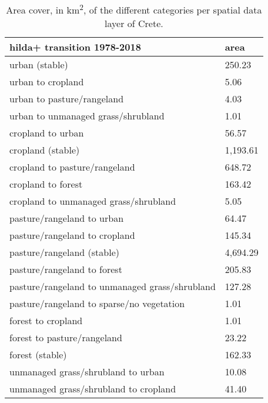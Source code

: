 \begin{longtable}{ll}
    \caption{Area cover, in km\textsuperscript{2}, of the different categories per spatial data layer of Crete. \label{table:crete_data_cube_area}} \\
\textbf{hilda+ transition 1978-2018}               & \textbf{area}    \\
\endfirsthead
%
\endhead
%
urban (stable)                                     & 250.23           \\
urban to cropland                                  & 5.06             \\
urban to pasture/rangeland                         & 4.03             \\
urban to unmanaged grass/shrubland                 & 1.01             \\
cropland to urban                                  & 56.57            \\
cropland (stable)                                  & 1,193.61         \\
cropland to pasture/rangeland                      & 648.72           \\
cropland to forest                                 & 163.42           \\
cropland to unmanaged grass/shrubland              & 5.05             \\
pasture/rangeland to urban                         & 64.47            \\
pasture/rangeland to cropland                      & 145.34           \\
pasture/rangeland (stable)                         & 4,694.29         \\
pasture/rangeland to forest                        & 205.83           \\
pasture/rangeland to unmanaged grass/shrubland     & 127.28           \\
pasture/rangeland to sparse/no vegetation          & 1.01             \\
forest to cropland                                 & 1.01             \\
forest to pasture/rangeland                        & 23.22            \\
forest (stable)                                    & 162.33           \\
unmanaged grass/shrubland to urban                 & 10.08            \\
unmanaged grass/shrubland to cropland              & 41.40            \\

\end{longtable}
